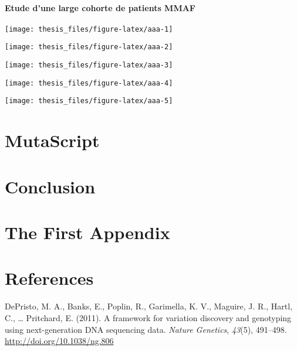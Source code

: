 \documentclass[12pt,twoside]{reedthesis}
\theoremstyle{definition}
\theoremstyle{definition}
\theoremstyle{remark}
\begin{document}
  \hypertarget{cohortemmah}{\subsubsection{Etude d'une large cohorte de
  patients MMAF}\label{cohortemmah}}
  
  \begin{center}\texttt{[image: thesis\_files/figure-latex/aaa-1]} \end{center}
  
  \begin{center}\texttt{[image: thesis\_files/figure-latex/aaa-2]} \end{center}
  
  \begin{center}\texttt{[image: thesis\_files/figure-latex/aaa-3]} \end{center}
  
  \begin{center}\texttt{[image: thesis\_files/figure-latex/aaa-4]} \end{center}
  
  \begin{center}\texttt{[image: thesis\_files/figure-latex/aaa-5]} \end{center}
  
  \chapter{MutaScript}\label{mutascript}
  
  \chapter*{Conclusion}\label{conclusion}
  
  \chapter{The First Appendix}\label{the-first-appendix}
  
  \chapter*{References}\label{references}
  
  \hypertarget{refs}{}
  \hypertarget{ref-DePristo2011}{}
  DePristo, M. A., Banks, E., Poplin, R., Garimella, K. V., Maguire, J.
  R., Hartl, C., \ldots{} Pritchard, E. (2011). A framework for variation
  discovery and genotyping using next-generation DNA sequencing data.
  \emph{Nature Genetics}, \emph{43}(5), 491--498.
  \url{http://doi.org/10.1038/ng.806}
  
\end{document}
